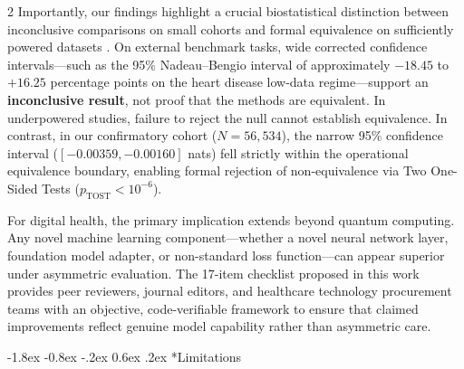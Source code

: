 \documentclass[10pt,a4paper,twoside]{article}
\makeatletter
\renewcommand{\subsection}{\@startsection{subsection}{2}{\z@}%
  {-1.8ex \@plus -0.8ex \@minus -.2ex}%
  {0.6ex \@plus.2ex}%
  {\normalfont\normalsize\sffamily\bfseries\color{naturedark}}}
\makeatother
\begin{document}
\begin{multicols}{2}
Importantly, our findings highlight a crucial biostatistical distinction between inconclusive comparisons on small cohorts and formal equivalence on sufficiently powered datasets \cite{altman1995}. On external benchmark tasks, wide corrected confidence intervals---such as the 95\% Nadeau--Bengio interval of approximately $-18.45$ to $+16.25$ percentage points on the heart disease low-data regime---support an \textbf{inconclusive result}, not proof that the methods are equivalent. In underpowered studies, failure to reject the null cannot establish equivalence. In contrast, in our confirmatory cohort ($N = 56,534$), the narrow 95\% confidence interval ($[-0.00359, -0.00160]$ nats) fell strictly within the operational equivalence boundary, enabling formal rejection of non-equivalence via Two One-Sided Tests ($p_{\text{TOST}} < 10^{-6}$).

For digital health, the primary implication extends beyond quantum computing. Any novel machine learning component---whether a novel neural network layer, foundation model adapter, or non-standard loss function---can appear superior under asymmetric evaluation. The 17-item checklist proposed in this work provides peer reviewers, journal editors, and healthcare technology procurement teams with an objective, code-verifiable framework to ensure that claimed improvements reflect genuine model capability rather than asymmetric care.

\subsection*{Limitations}


\end{multicols}
\end{document}
